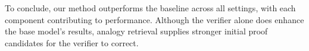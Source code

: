 
\smallskip

To conclude, our method outperforms the baseline across all settings, with each component contributing to performance.  Although the verifier alone does enhance the base model’s results, analogy retrieval supplies stronger initial proof candidates for the verifier to correct.  

